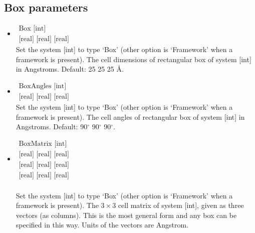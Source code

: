 \subsection*{Box parameters}
\begin{itemize}
\item{$\begin{array}{l}\text{Box [int]}\\ \text{[real] [real] [real]}\end{array}$}\\
Set the system [int] to type `Box' (other option is `Framework' when a framework is present).
The cell dimensions of rectangular box of system [int] in Angstroms. Default: 25 25 25 \AA.
\item{$\begin{array}{l}\text{BoxAngles [int]}\\ \text{[real] [real] [real]}\end{array}$}\\
Set the system [int] to type `Box' (other option is `Framework' when a framework is present).
The cell angles of rectangular box of system [int] in Angstroms. Default: 90$^\circ$ 90$^\circ$ 90$^\circ$.
\item{$\begin{array}{l}\text{BoxMatrix [int]}\\ 
      \text{[real] [real] [real]}\\
      \text{[real] [real] [real]}\\
      \text{[real] [real] [real]}\end{array}$\\
       }\\
Set the system [int] to type `Box' (other option is `Framework' when a framework is present).
The $3\times3$ cell matrix of system [int], given as three vectors (as columns). 
This is the most general form and any box can be specified in this way. Units of the vectors are Angstrom.
\end{itemize}


